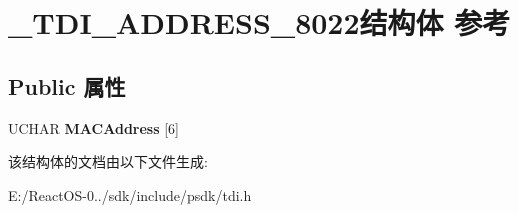 \hypertarget{struct___t_d_i___a_d_d_r_e_s_s__8022}{}\section{\+\_\+\+T\+D\+I\+\_\+\+A\+D\+D\+R\+E\+S\+S\+\_\+8022结构体 参考}
\label{struct___t_d_i___a_d_d_r_e_s_s__8022}
\subsection*{Public 属性}
\begin{DoxyCompactItemize}
\item 
\mbox{\label{struct___t_d_i___a_d_d_r_e_s_s__8022_a12bbf9b196f2291ab007e00c4883ce4e}} 
U\+C\+H\+AR {\bfseries M\+A\+C\+Address} \mbox{[}6\mbox{]}
\end{DoxyCompactItemize}


该结构体的文档由以下文件生成\+:\begin{DoxyCompactItemize}
\item 
E\+:/\+React\+O\+S-\/0../sdk/include/psdk/tdi.\+h\end{DoxyCompactItemize}
